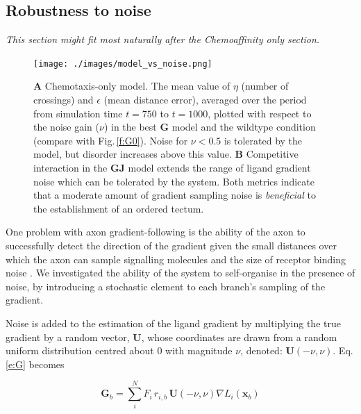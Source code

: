\documentclass[11pt, a4paper, draft]{article}
\begin{document}

\subsection*{Robustness to noise}

\emph{This section might fit most naturally after the Chemoaffinity only section.}

\begin{figure}
\centering
\texttt{[image: ./images/model\_vs\_noise.png]}
\caption{ \textbf{A} Chemotaxis-only model. The mean value of $\eta$ (number of crossings) and $\epsilon$
(mean distance error), averaged over the period from simulation time $t=750$ to $t=1000$, plotted with respect to the
noise gain ($\nu$) in the best $\mathbf{G}$ model and the wildtype condition (compare with
Fig.\,\ref{f:G0}). Noise for $\nu < 0.5$ is tolerated by the model, but
disorder increases above this value.
\textbf{B} Competitive interaction in the $\mathbf{GJ}$ model extends the
range of ligand gradient noise which can be tolerated by the system.
Both metrics indicate that a moderate
amount of gradient sampling noise is \emph{beneficial} to the establishment of
an ordered tectum.}
\label{f:noise}
\end{figure}

One problem with axon gradient-following is the ability of the axon to
successfully detect the direction of the gradient given the small distances
over which the axon can sample signalling molecules and the size of receptor
binding noise \citep{goodhill_noise_2014}.  We investigated the ability of the
system to self-organise in the presence of noise, by introducing a stochastic
element to each branch's sampling of the gradient.

Noise is added to the estimation of the ligand gradient by multiplying the
true gradient by a random vector, $\mathbf{U}$, whose coordinates are drawn
from a random uniform distribution centred about 0 with magnitude $\nu$, denoted:
$\mathbf{U}(-\nu, \nu)$. Eq.\,\ref{e:G} becomes

\begin{equation}\label{e:Gnu}
\mathbf{G}_b = \sum_i^N F_i\,r_{i,b}\, \mathbf{U}(-\nu, \nu) \nabla L_i(\mathbf{x}_b)
\end{equation}
\end{document}
